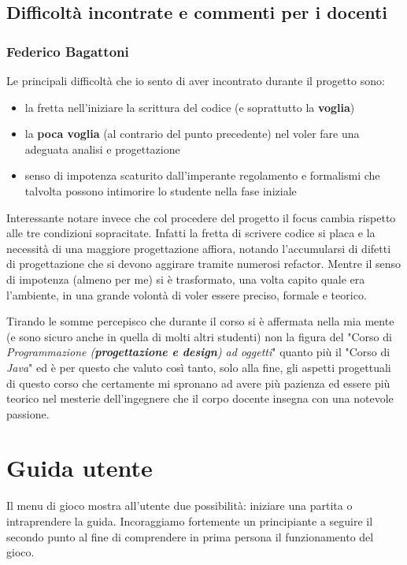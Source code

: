 \documentclass[a4paper,12pt]{report}
\begin{document}
\section{Difficoltà incontrate e commenti per i docenti}
\subsection{Federico Bagattoni}
Le principali difficoltà che io sento di aver incontrato durante il progetto sono: 
\begin{itemize}
    \item la fretta nell'iniziare la scrittura del codice (e soprattutto la \textbf{voglia})
    \item la \textbf{poca voglia} (al contrario del punto precedente) nel voler fare una adeguata analisi e progettazione
    \item senso di impotenza scaturito dall'imperante regolamento e formalismi che talvolta possono intimorire lo studente nella fase iniziale
\end{itemize}
Interessante notare invece che col procedere del progetto il focus cambia rispetto alle tre condizioni sopracitate. Infatti la fretta di scrivere codice si placa e la necessità di una maggiore progettazione affiora, notando l'accumularsi di difetti di progettazione che si devono aggirare tramite numerosi refactor. Mentre il senso di impotenza (almeno per me) si è trasformato, una volta capito quale era l'ambiente, in una grande volontà di voler essere preciso, formale e teorico. 
\par 
Tirando le somme percepisco che durante il corso si è affermata nella mia mente (e sono sicuro anche in quella di molti altri studenti) non la figura del "Corso di \textit{Programmazione (\textbf{progettazione e design}) ad oggetti}" quanto più il "Corso di \textit{Java}" ed è per questo che valuto così tanto, solo alla fine, gli aspetti progettuali di questo corso che certamente mi spronano ad avere più pazienza ed essere più teorico nel mesterie dell'ingegnere che il corpo docente insegna con una notevole passione.
\appendix
\chapter{Guida utente}
Il menu di gioco mostra all'utente due possibilità: iniziare una partita o intraprendere la guida. Incoraggiamo fortemente un principiante a seguire il secondo punto al fine di comprendere in prima persona il funzionamento del gioco.
\end{document}
